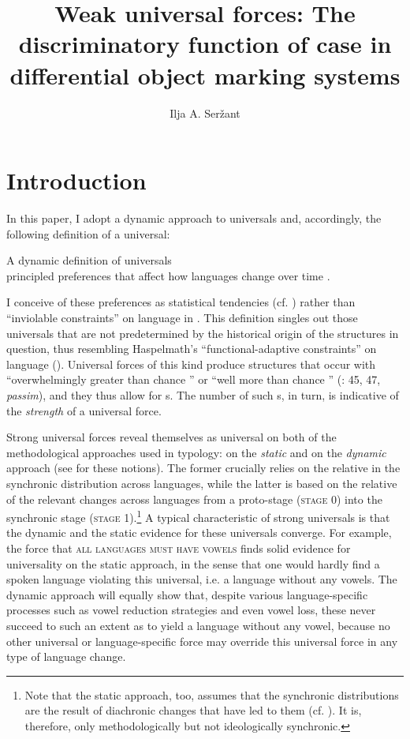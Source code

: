 \documentclass[output=paper]{langsci/langscibook}
\author{Ilja A. Seržant\affiliation{Leipzig University}}
\title{Weak universal forces: The discriminatory function of case in differential object marking systems}
\begin{document}
\maketitle 
 

\section{Introduction}

In this paper, I adopt a dynamic approach to universals \citep{Greenberg1978_Diachr} and, accordingly, the following definition of a universal:

\ea\label{ex:serzant:1}
A dynamic definition of universals\\
principled preferences that affect how languages change over time \citep[401]{Bickel2011_Modelling}.
\z

\noindent I conceive of these preferences as statistical tendencies (cf. \citealt{Bickel2011_Modelling}) rather than “inviolable constraints” on language in \citet{Kiparsky2008}. This definition singles out those universals that are not predetermined by the historical origin of the structures in question, thus resembling Haspelmath’s “functional-adaptive constraints” on language (). Universal forces of this kind produce structures that occur with “overwhelmingly greater than chance ” or “well more than chance ” (\citealt{Greenberg1963}: 45, 47, \textit{passim}), and they thus allow for s. The number of such s, in turn, is indicative of the \textit{strength} of a universal force. 

Strong universal forces reveal themselves as universal on both of the methodological approaches used in typology: on the \textit{static} and on the \textit{dynamic} approach (see \citealt{Greenberg1969} for these notions). The former crucially relies on the relative  in the synchronic distribution across languages, while the latter is based on the relative  of the relevant changes across languages from a proto-stage (\textsc{stage} 0) into the synchronic stage (\textsc{stage} 1).\footnote{Note that the static approach, too, assumes that the synchronic distributions are the result of diachronic changes that have led to them (cf. ). It is, therefore, only methodologically but not ideologically synchronic.} A typical characteristic of strong universals is that the dynamic and the static evidence for these universals converge. For example, the force that \textsc{all languages must have vowels} \citep[19]{Comrie1989} finds solid evidence for universality on the static approach, in the sense that one would hardly find a spoken language violating this universal, i.e. a language without any vowels. The dynamic approach will equally show that, despite various language-specific processes such as vowel reduction strategies and even vowel loss, these never succeed to such an extent as to yield a language without any vowel, because no other universal or language-specific force may override this universal force in any type of language change.  
\end{document}
